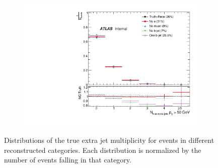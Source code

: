 \begin{figure}
\begin{subfigure}[]{0.45\textwidth}
\end{subfigure}
~
\begin{subfigure}[]{0.45\textwidth}
\includegraphics[width=\textwidth]{fig/TruthNotReco/NTruthExtraJets50.pdf}
\end{subfigure}

\caption{Distributions of the true extra jet multiplicity for events in different reconstructed categories. Each distribution is normalized by the number of events falling in that category.}
\label{fig:norecojetmult}

\end{figure}
\clearpage

